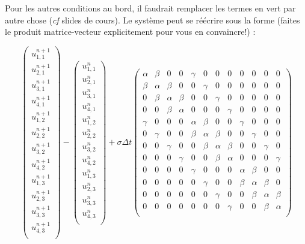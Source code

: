 \documentclass[11pt]{article}
\begin{document}
Pour les autres conditions au bord, il faudrait remplacer les termes en vert par autre chose (\emph{cf} slides de cours).
Le système peut se réécrire sous la forme (faites le produit matrice-vecteur explicitement pour vous en convaincre!) :

\setcounter{MaxMatrixCols}{12}
\begin{equation}
\left(
\begin{array}{c}
u^{n+1}_{1,1}\\
u^{n+1}_{2,1}\\
u^{n+1}_{3,1}\\
u^{n+1}_{4,1}\\
u^{n+1}_{1,2}\\
u^{n+1}_{2,2}\\
u^{n+1}_{3,2}\\
u^{n+1}_{4,2}\\
u^{n+1}_{1,3}\\
u^{n+1}_{2,3}\\
u^{n+1}_{3,3}\\
u^{n+1}_{4,3}\\
\end{array}
\right)
-
\left(
\begin{array}{c}
u^{n}_{1,1}\\
u^{n}_{2,1}\\
u^{n}_{3,1}\\
u^{n}_{4,1}\\
u^{n}_{1,2}\\
u^{n}_{2,2}\\
u^{n}_{3,2}\\
u^{n}_{4,2}\\
u^{n}_{1,3}\\
u^{n}_{2,3}\\
u^{n}_{3,3}\\
u^{n}_{4,3}\\
\end{array}
\right)
+ 
\sigma \Delta t 
\begin{pmatrix}
\alpha & \beta & 0 & 0 & \gamma & 0 & 0 & 0 & 0 & 0 & 0 & 0 \\
\beta & \alpha & \beta & 0 & 0 & \gamma & 0 & 0 & 0 & 0 & 0 & 0 \\
0 & \beta & \alpha & \beta & 0 & 0 & \gamma & 0 & 0 & 0 & 0 & 0 \\
0 & 0 & \beta & \alpha & 0 & 0 & 0 & \gamma & 0 & 0 & 0 & 0 \\
\gamma & 0 & 0 & 0 & \alpha & \beta & 0 & 0 & \gamma & 0 & 0 & 0 \\
0 & \gamma & 0 & 0 & \beta & \alpha & \beta & 0 & 0 & \gamma & 0 & 0 \\
0 & 0 & \gamma & 0 & 0 & \beta & \alpha & \beta & 0 & 0 & \gamma & 0 \\
0 & 0 & 0 & \gamma & 0 & 0 & \beta & \alpha & 0 & 0 & 0 & \gamma \\
0 & 0 & 0 & 0 & \gamma & 0 & 0 & 0 & \alpha & \beta & 0 & 0 \\
0 & 0 & 0 & 0 & 0 & \gamma & 0 & 0 & \beta & \alpha & \beta & 0 \\
0 & 0 & 0 & 0 & 0 & 0 & \gamma & 0 & 0 & \beta & \alpha & \beta \\
0 & 0 & 0 & 0 & 0 & 0 & 0 & \gamma & 0 & 0 & \beta & \alpha \\


\end{pmatrix}
\end{equation}
\end{document}

